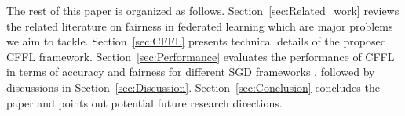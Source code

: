 \documentclass{article}
\newcommand{\eg}{\textit{e.g.},\xspace}
\begin{document}

The rest of this paper is organized as follows. Section~\ref{sec:Related_work} reviews the related literature on fairness in federated learning which are major problems we aim to tackle. Section~\ref{sec:CFFL} presents technical details of the proposed CFFL framework. Section~\ref{sec:Performance} evaluates the performance of CFFL in terms of accuracy and fairness for different SGD frameworks%
, followed by discussions in Section~\ref{sec:Discussion}. Section~\ref{sec:Conclusion} concludes the paper and points out potential future research directions. 

\end{document}
